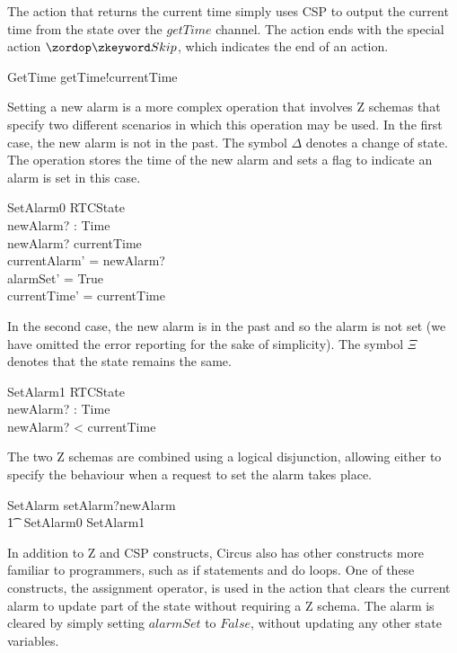 \documentclass[a4paper,10pt]{report}
\begin{document}
%
The action that returns the current time simply uses CSP to output the current
time from the state over the $getTime$ channel. The action ends with the special
action $\Skip$, which indicates the end of an action.
%
\begin{circusaction}
  GetTime \circdef getTime!currentTime \then \Skip
\end{circusaction}
%
Setting a new alarm is a more complex operation that involves Z schemas that
specify two different scenarios in which this operation may be used. In the
first case, the new alarm is not in the past. The symbol $\Delta$ denotes a
change of state. The operation stores the time of the new alarm and sets a flag
to indicate an alarm is set in this case.
%
\begin{schema}{SetAlarm0}
  \Delta RTCState \\
  newAlarm? : Time \\
\where
  newAlarm? \geq currentTime \\
  currentAlarm' = newAlarm? \\
  alarmSet' = True \\
  currentTime' = currentTime \\
\end{schema}
%
In the second case, the new alarm is in the past and so the alarm is not set (we
have omitted the error reporting for the sake of simplicity). The symbol $\Xi$
denotes that the state remains the same.
%
\begin{schema}{SetAlarm1}
  \Xi RTCState \\
  newAlarm? : Time \\
\where
  newAlarm? < currentTime \\
\end{schema}
%
The two Z schemas are combined using a logical disjunction, allowing either to
specify the behaviour when a request to set the alarm takes place.
%
\begin{circusaction}
  SetAlarm \circdef setAlarm?newAlarm \\
  \t1 \then\ \lschexpract SetAlarm0 \lor SetAlarm1 \rschexpract
\end{circusaction}
%
In addition to Z and CSP constructs, Circus also has other constructs more
familiar to programmers, such as if statements and do loops. One of these
constructs, the assignment operator, is used in the action that clears the
current alarm to update part of the state without requiring a Z schema.  The
alarm is cleared by simply setting $alarmSet$ to $False$, without updating any
other state variables.
\end{document}
